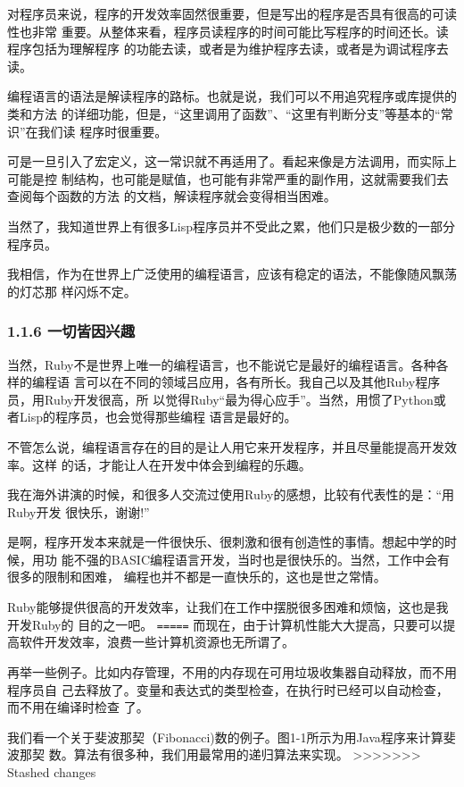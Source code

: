 \documentclass[color=cyan,mathpazo,titlestyle=hang]{elegantbook}
\begin{document}
对程序员来说，程序的开发效率固然很重要，但是写出的程序是否具有很高的可读性也非常
重要。从整体来看，程序员读程序的时间可能比写程序的时间还长。读程序包括为理解程序
的功能去读，或者是为维护程序去读，或者是为调试程序去读。

编程语言的语法是解读程序的路标。也就是说，我们可以不用追究程序或库提供的类和方法
的详细功能，但是，“这里调用了函数”、“这里有判断分支”等基本的“常识”在我们读
程序时很重要。

可是一旦引入了宏定义，这一常识就不再适用了。看起来像是方法调用，而实际上可能是控
制结构，也可能是赋值，也可能有非常严重的副作用，这就需要我们去查阅每个函数的方法
的文档，解读程序就会变得相当困难。

当然了，我知道世界上有很多Lisp程序员并不受此之累，他们只是极少数的一部分程序员。

我相信，作为在世界上广泛使用的编程语言，应该有稳定的语法，不能像随风飘荡的灯芯那
样闪烁不定。

\subsubsection{1.1.6 一切皆因兴趣}
\label{sec:org6f8225d}

当然，Ruby不是世界上唯一的编程语言，也不能说它是最好的编程语言。各种各样的编程语
言可以在不同的领域吕应用，各有所长。我自己以及其他Ruby程序员，用Ruby开发很高，所
以觉得Ruby“最为得心应手”。当然，用惯了Python或者Lisp的程序员，也会觉得那些编程
语言是最好的。

不管怎么说，编程语言存在的目的是让人用它来开发程序，并且尽量能提高开发效率。这样
的话，才能让人在开发中体会到编程的乐趣。

我在海外讲演的时候，和很多人交流过使用Ruby的感想，比较有代表性的是：“用Ruby开发
很快乐，谢谢!”

是啊，程序开发本来就是一件很快乐、很刺激和很有创造性的事情。想起中学的时候，用功
能不强的BASIC编程语言开发，当时也是很快乐的。当然，工作中会有很多的限制和困难，
编程也并不都是一直快乐的，这也是世之常情。

Ruby能够提供很高的开发效率，让我们在工作中摆脱很多困难和烦恼，这也是我开发Ruby的
目的之一吧。
\texttt{=====}
而现在，由于计算机性能大大提高，只要可以提高软件开发效率，浪费一些计算机资源也无所谓了。

再举一些例子。比如内存管理，不用的内存现在可用垃圾收集器自动释放，而不用程序员自
己去释放了。变量和表达式的类型检查，在执行时已经可以自动检查，而不用在编译时检查
了。

我们看一个关于斐波那契（Fibonacci)数的例子。图1-1所示为用Java程序来计算斐波那契
数。算法有很多种，我们用最常用的递归算法来实现。
>>>>>>> Stashed changes
\end{document}
